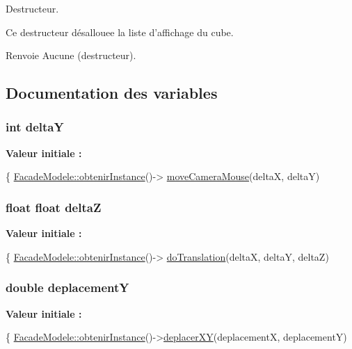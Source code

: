 Destructeur. 

Ce destructeur désallouee la liste d'affichage du cube.

\begin{DoxyReturn}{Renvoie}
Aucune (destructeur). 
\end{DoxyReturn}


\subsection{Documentation des variables}
\hypertarget{group__inf2990_ga3cffe82b93dca31f1da5bcde540a5f96}{
\subsubsection[{delta\-Y}]{\setlength{\rightskip}{0pt plus 5cm}int delta\-Y}}\label{group__inf2990_ga3cffe82b93dca31f1da5bcde540a5f96}
{\bfseries Valeur initiale \-:}
\begin{DoxyCode}
\{
        \hyperlink{group__inf2990_ga63593b81c6f3cc2251e2b61d9e8fc670}{FacadeModele::obtenirInstance}()->
      \hyperlink{group__inf2990_gaba7107809948a77f8ef3bf2240bc2bc4}{moveCameraMouse}(deltaX, deltaY)
\end{DoxyCode}
\hypertarget{group__inf2990_ga9644447719a7934b7eca34bdf6656363}{
\subsubsection[{delta\-Z}]{\setlength{\rightskip}{0pt plus 5cm}float float delta\-Z}}\label{group__inf2990_ga9644447719a7934b7eca34bdf6656363}
{\bfseries Valeur initiale \-:}
\begin{DoxyCode}
\{
        \hyperlink{group__inf2990_ga63593b81c6f3cc2251e2b61d9e8fc670}{FacadeModele::obtenirInstance}()->
      \hyperlink{group__inf2990_ga3c29bb5fb742aacf7bea3f62357c4f48}{doTranslation}(deltaX, deltaY, deltaZ)
\end{DoxyCode}
\hypertarget{group__inf2990_ga84b180f09e9802d980aa3f7cc71703da}{
\subsubsection[{deplacement\-Y}]{\setlength{\rightskip}{0pt plus 5cm}double deplacement\-Y}}\label{group__inf2990_ga84b180f09e9802d980aa3f7cc71703da}
{\bfseries Valeur initiale \-:}
\begin{DoxyCode}
\{
        \hyperlink{group__inf2990_ga63593b81c6f3cc2251e2b61d9e8fc670}{FacadeModele::obtenirInstance}()->\hyperlink{group__inf2990_ga1d0468d14d18990c39861b22d4921a7c}{deplacerXY}(deplacementX, 
      deplacementY)
\end{DoxyCode}
